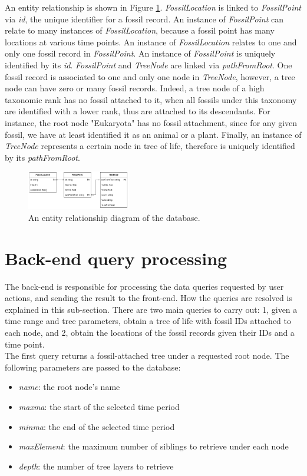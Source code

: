 \documentclass[11pt, a4paper,oneside,chapterprefix=false]{scrbook}
\begin{document}
An entity relationship is shown in Figure \ref{fig:er}. \emph{FossilLocation} is linked to \emph{FossilPoint} via \emph{id}, the unique identifier for a fossil record. An instance of \emph{FossilPoint} can relate to many instances of \emph{FossilLocation}, because a fossil point has many locations at various time points. An instance of \emph{FossilLocation} relates to one and only one fossil record in \emph{FossilPoint}. An instance of \emph{FossilPoint} is uniquely identified by its \emph{id}. \emph{FossilPoint} and \emph{TreeNode} are linked via \emph{pathFromRoot}. One fossil record is associated to one and only one node in \emph{TreeNode}, however, a tree node can have zero or many fossil records. Indeed, a tree node of a high taxonomic rank has no fossil attached to it, when all fossils under this taxonomy are identified with a lower rank, thus are attached to its descendants. For instance, the root node "Eukaryota" has no fossil attachment, since for any given fossil, we have at least identified it as an animal or a plant. Finally, an instance of \emph{TreeNode} represents a certain node in tree of life, therefore is uniquely identified by its \emph{pathFromRoot}.
\begin{figure}[h]
	\centering
	\includegraphics[width=0.4\textwidth]{figures/technical_solution/er}
	\caption{An entity relationship diagram of the database.}
	\label{fig:er}
\end{figure}

\section{Back-end query processing} \label{sec:tec_backend}
The back-end is responsible for processing the data queries requested by user actions, and sending the result to the front-end. How the queries are resolved is explained in this sub-section. There are two main queries to carry out: 1, given a time range and tree parameters, obtain a tree of life with fossil IDs attached to each node, and 2, obtain the locations of the fossil records given their IDs and a time point. \\

The first query returns a fossil-attached tree under a requested root node. The following parameters are passed to the database: 
\begin{itemize}
	\item \textit{name}: the root node's name
	\item \textit{maxma}: the start of the selected time period
	\item \textit{minma}: the end of the selected time period
	\item \textit{maxElement}: the maximum number of siblings to retrieve under each node
	\item \textit{depth}: the number of tree layers to retrieve 
\end{itemize}
\end{document}
